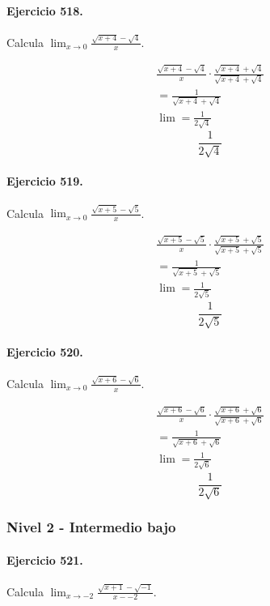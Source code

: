 \documentclass[11pt,a4paper]{article}
\begin{document}
\paragraph{Ejercicio 518.} Calcula $\displaystyle\lim_{x\to0}\frac{\sqrt{x+4}-\sqrt{4}}{x}$.

\[
\begin{aligned}
\frac{\sqrt{x+4}-\sqrt{4}}{x}\cdot \frac{\sqrt{x+4}+\sqrt{4}}{\sqrt{x+4}+\sqrt{4}}\\
=\frac{1}{\sqrt{x+4}+\sqrt{4}}\\
\lim=\frac{1}{2\sqrt{4}}
\end{aligned}
\]
\[\boxed{\frac{1}{2\sqrt{4}}}\]


\paragraph{Ejercicio 519.} Calcula $\displaystyle\lim_{x\to0}\frac{\sqrt{x+5}-\sqrt{5}}{x}$.

\[
\begin{aligned}
\frac{\sqrt{x+5}-\sqrt{5}}{x}\cdot \frac{\sqrt{x+5}+\sqrt{5}}{\sqrt{x+5}+\sqrt{5}}\\
=\frac{1}{\sqrt{x+5}+\sqrt{5}}\\
\lim=\frac{1}{2\sqrt{5}}
\end{aligned}
\]
\[\boxed{\frac{1}{2\sqrt{5}}}\]


\paragraph{Ejercicio 520.} Calcula $\displaystyle\lim_{x\to0}\frac{\sqrt{x+6}-\sqrt{6}}{x}$.

\[
\begin{aligned}
\frac{\sqrt{x+6}-\sqrt{6}}{x}\cdot \frac{\sqrt{x+6}+\sqrt{6}}{\sqrt{x+6}+\sqrt{6}}\\
=\frac{1}{\sqrt{x+6}+\sqrt{6}}\\
\lim=\frac{1}{2\sqrt{6}}
\end{aligned}
\]
\[\boxed{\frac{1}{2\sqrt{6}}}\]


\newpage

\subsubsection*{Nivel 2 - Intermedio bajo}

\paragraph{Ejercicio 521.} Calcula $\displaystyle\lim_{x\to -2}\frac{\sqrt{x+1}-\sqrt{-1}}{x--2}$.
\end{document}
